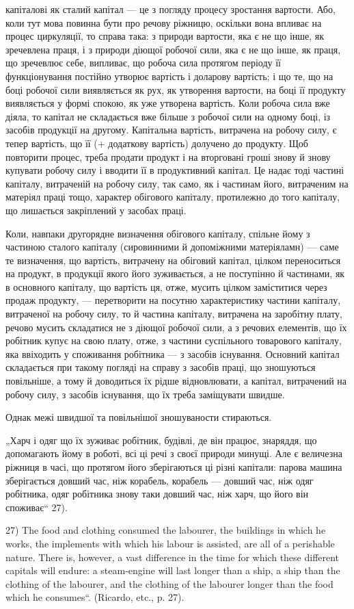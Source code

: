 капіталові як сталий капітал — це з погляду процесу зростання вартости.
Або, коли тут мова повинна бути про речову ріжницю, оскільки вона
впливає на процес циркуляції, то справа така: з природи вартости, яка є
не що інше, як зречевлена праця, і з природи діющої робочої сили, яка
є не що інше, як праця, що зречевлює себе, випливає, що робоча сила
протягом періоду її функціонування постійно утворює вартість і доларову
вартість; і що те, що на боці робочої сили виявляється як рух, як
утворення вартости, на боці її продукту виявляється у формі спокою,
як уже утворена вартість. Коли робоча сила вже діяла, то капітал не
складається вже більше з робочої сили на одному боці, із засобів продукції
на другому. Капітальна вартість, витрачена на робочу силу, є тепер
вартість, що її (+ додаткову вартість) долучено до продукту. Щоб
повторити процес, треба продати продукт і на вторговані гроші знову й
знову купувати робочу силу і вводити її в продуктивний капітал. Це
надає тоді частині капіталу, витраченій на робочу силу, так само, як і частинам
його, витраченим на матеріял праці тощо, характер обігового капіталу,
протилежно до того капіталу, що лишається закріплений у засобах праці.

Коли, навпаки другорядне визначення обігового капіталу, спільне
йому з частиною сталого капіталу (сировинними й допоміжними матеріяламн)
— саме те визначення, що вартість, витрачену на обіговий капітал,
цілком переноситься на продукт, в продукції якого його зуживається, а
не поступінно й частинами, як в основного капіталу, що вартість ця,
отже, мусить цілком заміститися через продаж продукту, — перетворити
на посутню характеристику частини капіталу, витраченої на робочу силу,
то й частина капіталу, витрачена на заробітну плату, речово мусить
складатися не з діющої робочої сили, а з речових елементів, що їх робітник
купує на свою плату, отже, з частини суспільного товарового капіталу,
яка ввіходить у споживання робітника — з засобів існування.
Основний капітал складається при такому погляді на справу з засобів
праці, що зношуються повільніше, а тому й доводиться їх рідше відновлювати,
а капітал, витрачений на робочу силу, з засобів існування, що
їх треба заміщувати швидше.

Однак межі швидшої та повільнішої зношуваности стираються.

„Харч і одяг що їх зуживає робітник, будівлі, де він працює, знаряддя,
що допомагають йому в роботі, всі ці речі з своєї природи минущі.
Але є величезна ріжниця в часі, що протягом його зберігаються
ці різні капітали: парова машина зберігається довший час, ніж корабель,
корабель — довший час, ніж одяг робітника, одяг робітника знову таки
довший час, ніж харч, що його він споживає“ 27).

27) The food and clothing consumed the labourer, the buildings in which he
works, the implements with which his labour is assisted, are all of a perishable
nature. There is, however, a vast difference in the time for which these different
capitals will endure: a steam-engine will last longer than a ship, a ship than the
clothing of the labourer, and the clothing of the labourer longer than the food which
he consumes“. (Ricardo, etc., p. 27).
